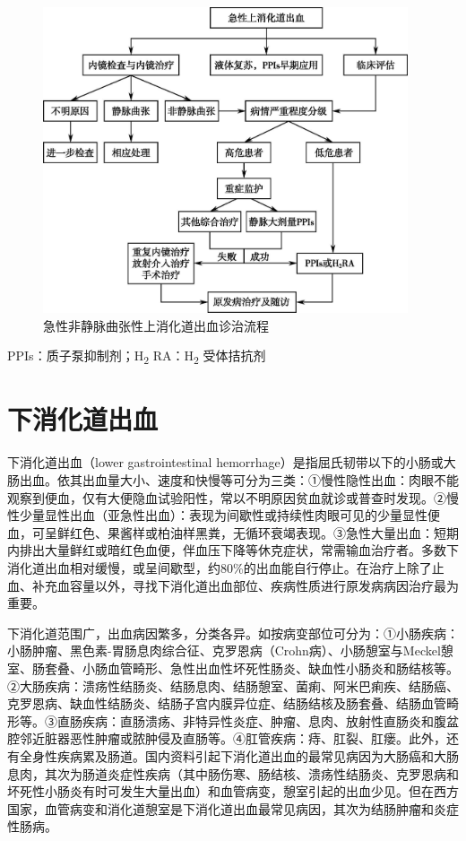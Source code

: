 \begin{figure}[!htbp]
 \centering
 \includegraphics[width=4.23958in,height=3.55208in]{./images/Image00058.jpg}
 \captionsetup{justification=centering}
 \caption{急性非静脉曲张性上消化道出血诊治流程}
 \label{fig13-1}
  \end{figure} 

PPIs：质子泵抑制剂；H\textsubscript{2} RA：H\textsubscript{2} 受体拮抗剂

\protect\hypertarget{text00033.html}{}{}

\section{下消化道出血}

下消化道出血（lower gastrointestinal
hemorrhage）是指屈氏韧带以下的小肠或大肠出血。依其出血量大小、速度和快慢等可分为三类：①慢性隐性出血：肉眼不能观察到便血，仅有大便隐血试验阳性，常以不明原因贫血就诊或普查时发现。②慢性少量显性出血（亚急性出血）：表现为间歇性或持续性肉眼可见的少量显性便血，可呈鲜红色、果酱样或柏油样黑粪，无循环衰竭表现。③急性大量出血：短期内排出大量鲜红或暗红色血便，伴血压下降等休克症状，常需输血治疗者。多数下消化道出血相对缓慢，或呈间歇型，约80\%的出血能自行停止。在治疗上除了止血、补充血容量以外，寻找下消化道出血部位、疾病性质进行原发病病因治疗最为重要。

下消化道范围广，出血病因繁多，分类各异。如按病变部位可分为：①小肠疾病：小肠肿瘤、黑色素-胃肠息肉综合征、克罗恩病（Crohn病）、小肠憩室与Meckel憩室、肠套叠、小肠血管畸形、急性出血性坏死性肠炎、缺血性小肠炎和肠结核等。②大肠疾病：溃疡性结肠炎、结肠息肉、结肠憩室、菌痢、阿米巴痢疾、结肠癌、克罗恩病、缺血性结肠炎、结肠子宫内膜异位症、结肠结核及肠套叠、结肠血管畸形等。③直肠疾病：直肠溃疡、非特异性炎症、肿瘤、息肉、放射性直肠炎和腹盆腔邻近脏器恶性肿瘤或脓肿侵及直肠等。④肛管疾病：痔、肛裂、肛瘘。此外，还有全身性疾病累及肠道。国内资料引起下消化道出血的最常见病因为大肠癌和大肠息肉，其次为肠道炎症性疾病（其中肠伤寒、肠结核、溃疡性结肠炎、克罗恩病和坏死性小肠炎有时可发生大量出血）和血管病变，憩室引起的出血少见。但在西方国家，血管病变和消化道憩室是下消化道出血最常见病因，其次为结肠肿瘤和炎症性肠病。

